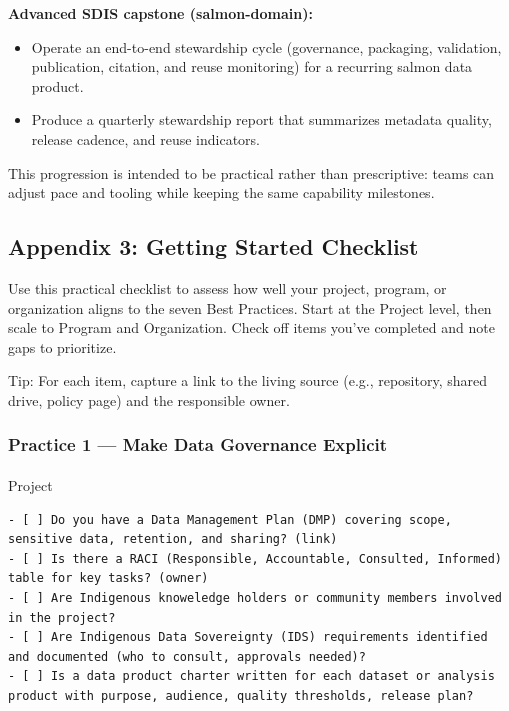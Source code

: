 \documentclass[
  letterpaper,
  DIV=11,
  numbers=noendperiod]{scrartcl}
\makeatletter
\let\oldparagraph\paragraph
\renewcommand{\paragraph}{
    \@ifstar
      \xxxParagraphStar
      \xxxParagraphNoStar
  }
\newcommand{\xxxParagraphStar}[1]{\oldparagraph*{#1}\mbox{}}
\newcommand{\xxxParagraphNoStar}[1]{\oldparagraph{#1}\mbox{}}
\providecommand{\tightlist}{%
  \setlength{\itemsep}{0pt}\setlength{\parskip}{0pt}}
\makeatother
\begin{document}
\textbf{Advanced SDIS capstone (salmon-domain):}

\begin{itemize}
\tightlist
\item
  Operate an end-to-end stewardship cycle (governance, packaging,
  validation, publication, citation, and reuse monitoring) for a
  recurring salmon data product.
\item
  Produce a quarterly stewardship report that summarizes metadata
  quality, release cadence, and reuse indicators.
\end{itemize}

This progression is intended to be practical rather than prescriptive:
teams can adjust pace and tooling while keeping the same capability
milestones.

\subsection{Appendix 3: Getting Started
Checklist}\label{appendix-3-getting-started-checklist}

Use this practical checklist to assess how well your project, program,
or organization aligns to the seven Best Practices. Start at the Project
level, then scale to Program and Organization. Check off items you've
completed and note gaps to prioritize.

Tip: For each item, capture a link to the living source (e.g.,
repository, shared drive, policy page) and the responsible owner.

\subsubsection{Practice 1 --- Make Data Governance
Explicit}\label{practice-1-make-data-governance-explicit}

\paragraph{Project}\label{project}

\begin{verbatim}
- [ ] Do you have a Data Management Plan (DMP) covering scope, sensitive data, retention, and sharing? (link)
- [ ] Is there a RACI (Responsible, Accountable, Consulted, Informed) table for key tasks? (owner)
- [ ] Are Indigenous knoweledge holders or community members involved in the project?
- [ ] Are Indigenous Data Sovereignty (IDS) requirements identified and documented (who to consult, approvals needed)?
- [ ] Is a data product charter written for each dataset or analysis product with purpose, audience, quality thresholds, release plan?
\end{verbatim}
\end{document}

